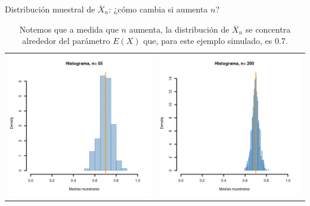 \documentclass{beamer}
\theoremstyle{definition}
\begin{document}
\begin{frame}[fragile]{\color{rosee}Distribuci\'on muestral de $\overline{X}_n$: ¿c\'omo cambia si aumenta $n$?}\small

\begin{table}[]
    \centering
    \begin{tabular}{cc}
  \includegraphics[scale=0.35]{slides1/img/Rplot10.png}       &  \includegraphics[scale=0.35]{slides1/img/Rplot39.png}   
    \end{tabular}
    \caption{Notemos que a medida que $n$ aumenta, la distribución de $\overline{X}_n$ se concentra alrededor del parámetro $E(X)$ que, para este ejemplo simulado, es 0.7.}
    \label{tab:my_label}
\end{table}
\end{frame}
\end{document}
